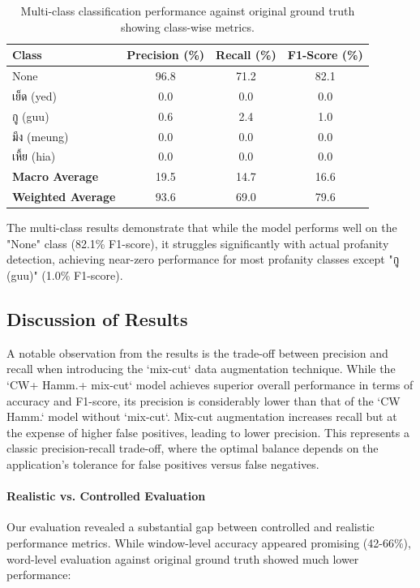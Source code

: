 \documentclass[11pt]{article}
\newcommand{\textthai}[1]{{\thaifont #1}}
\begin{document}
\begin{table}[H]
    \caption{Multi-class classification performance against original ground truth showing class-wise metrics.}
    \centering
    \label{tab:multiclass-performance}
    \begin{tabular}{|l|c|c|c|}
        \hline
        \textbf{Class} & \textbf{Precision (\%)} & \textbf{Recall (\%)} & \textbf{F1-Score (\%)} \\
        \hline
        None & 96.8 & 71.2 & 82.1 \\
        \textthai{เย็ด} (yed) & 0.0 & 0.0 & 0.0 \\
        \textthai{กู} (guu) & 0.6 & 2.4 & 1.0 \\
        \textthai{มึง} (meung) & 0.0 & 0.0 & 0.0 \\
        \textthai{เหี้ย} (hia) & 0.0 & 0.0 & 0.0 \\
        \hline
        \textbf{Macro Average} & 19.5 & 14.7 & 16.6 \\
        \textbf{Weighted Average} & 93.6 & 69.0 & 79.6 \\
        \hline
    \end{tabular}
\end{table}

The multi-class results demonstrate that while the model performs well on the "None" class (82.1\% F1-score), it struggles significantly with actual profanity detection, achieving near-zero performance for most profanity classes except "\textthai{กู} (guu)" (1.0\% F1-score).

\subsection{Discussion of Results}
A notable observation from the results is the trade-off between precision and recall when introducing the `mix-cut` data augmentation technique. While the `CW+ Hamm.+ mix-cut` model achieves superior overall performance in terms of accuracy and F1-score, its precision is considerably lower than that of the `CW Hamm.` model without `mix-cut`. Mix-cut augmentation increases recall but at the expense of higher false positives, leading to lower precision. This represents a classic precision-recall trade-off, where the optimal balance depends on the application's tolerance for false positives versus false negatives.

\paragraph{Realistic vs. Controlled Evaluation}
Our evaluation revealed a substantial gap between controlled and realistic performance metrics. While window-level accuracy appeared promising (42-66\%), word-level evaluation against original ground truth showed much lower performance:
\end{document}
